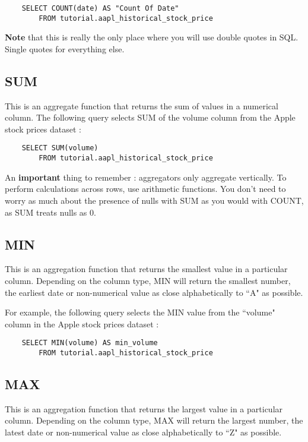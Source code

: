 \documentclass[12pt, letterpaper]{article}
\begin{document}
\begin{verbatim}
    SELECT COUNT(date) AS "Count Of Date"
        FROM tutorial.aapl_historical_stock_price
\end{verbatim}

\textbf{Note} that this is really the only place where you will use double quotes in SQL. Single quotes for everything else.

\subsection{SUM}
This is an aggregate function that returns the sum of values in a numerical column. The following query selects SUM of the volume column from the Apple stock prices dataset : 

\begin{verbatim}
    SELECT SUM(volume)
        FROM tutorial.aapl_historical_stock_price
\end{verbatim}

An \textbf{important} thing to remember : aggregators only aggregate vertically. To perform calculations across rows, use arithmetic functions. You don't need to worry as much about the presence of nulls with SUM as you would with COUNT, as SUM treats nulls as 0.

\subsection{MIN}
This is an aggregation function that returns the smallest value in a particular column. Depending on the column type, MIN will return the smallest number, the earliest date or non-numerical value as close alphabetically to ``A" as possible. 

For example, the following query selects the MIN value from the ``volume" column in the Apple stock prices dataset : 

\begin{verbatim}
    SELECT MIN(volume) AS min_volume
        FROM tutorial.aapl_historical_stock_price
\end{verbatim}

\subsection{MAX}
This is an aggregation function that returns the largest value in a particular column. Depending on the column type, MAX will return the largest number, the latest date or non-numerical value as close alphabetically to ``Z" as possible. 
\end{document}
